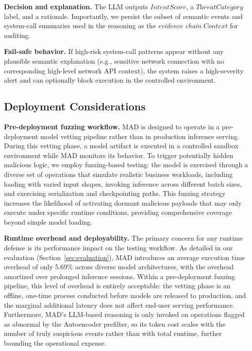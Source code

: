 \noindent \textbf{Decision and explanation.} The LLM outputs $\textit{IntentScore}$, a $\textit{ThreatCategory}$ label, and a rationale. Importantly, we persist the subset of semantic events and system-call summaries used in the reasoning as the \emph{evidence chain} $\textit{Context}$ for auditing.

\noindent \textbf{Fail-safe behavior.} If high-risk system-call patterns appear without any plausible semantic explanation (e.g., sensitive network connection with no corresponding high-level network API context), the system raises a high-severity alert and can optionally block execution in the controlled environment.

\subsection{Deployment Considerations}

\noindent \textbf{Pre-deployment fuzzing workflow.} MAD is designed to operate in a pre-deployment model vetting pipeline rather than in production inference serving. During this vetting phase, a model artifact is executed in a controlled sandbox environment while MAD monitors its behavior. To trigger potentially hidden malicious logic, we employ fuzzing-based testing\cite{}: the model is exercised through a diverse set of operations that simulate realistic business workloads, including loading with varied input shapes, invoking inference across different batch sizes, and exercising serialization and checkpointing paths. This fuzzing strategy increases the likelihood of activating dormant malicious payloads that may only execute under specific runtime conditions, providing comprehensive coverage beyond simple model loading.

\noindent \textbf{Runtime overhead and deployability.} The primary concern for any runtime defense is its performance impact on the testing workflow. As detailed in our evaluation (Section~\ref{sec:evaluation}), MAD introduces an average execution time overhead of only 5.69\% across diverse model architectures, with the overhead amortized over prolonged inference sessions. Within a pre-deployment fuzzing pipeline, this level of overhead is entirely acceptable: the vetting phase is an offline, one-time process conducted before models are released to production, and the marginal additional latency does not affect end-user serving performance. Furthermore, MAD's LLM-based reasoning is only invoked on operations flagged as abnormal by the Autoencoder prefilter, so its token cost scales with the number of truly suspicious events rather than with total runtime, further bounding the operational expense.
